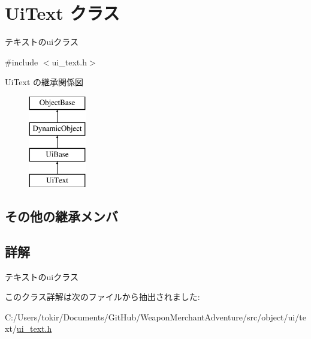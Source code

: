 \hypertarget{class_ui_text}{}\section{Ui\+Text クラス}
\label{class_ui_text}


テキストのuiクラス  




{\ttfamily \#include $<$ui\+\_\+text.\+h$>$}

Ui\+Text の継承関係図\begin{figure}[H]
\begin{center}
\leavevmode
\includegraphics[height=4.000000cm]{class_ui_text}
\end{center}
\end{figure}
\subsection*{その他の継承メンバ}


\subsection{詳解}
テキストのuiクラス 

このクラス詳解は次のファイルから抽出されました\+:\begin{DoxyCompactItemize}
\item 
C\+:/\+Users/tokir/\+Documents/\+Git\+Hub/\+Weapon\+Merchant\+Adventure/src/object/ui/text/\mbox{\hyperlink{ui__text_8h}{ui\+\_\+text.\+h}}\end{DoxyCompactItemize}
